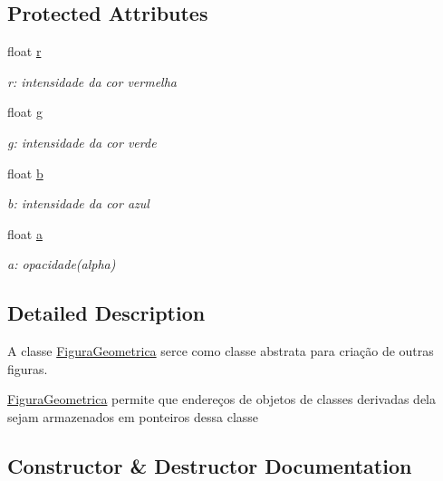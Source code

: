 \subsection*{Protected Attributes}
\begin{DoxyCompactItemize}
\item 
float \hyperlink{class_figura_geometrica_a0a4f57efb1a6c525c8aeee34c92e7eab}{r}
\begin{DoxyCompactList}\small\item\em r\+: intensidade da cor vermelha \end{DoxyCompactList}\item 
float \hyperlink{class_figura_geometrica_a51930549bcb90d016b824f10f95df355}{g}
\begin{DoxyCompactList}\small\item\em g\+: intensidade da cor verde \end{DoxyCompactList}\item 
float \hyperlink{class_figura_geometrica_a25e5d6c21410103c25ec55c0117dac0d}{b}
\begin{DoxyCompactList}\small\item\em b\+: intensidade da cor azul \end{DoxyCompactList}\item 
float \hyperlink{class_figura_geometrica_ae7c8a027fcec3c357265b90458a4d165}{a}
\begin{DoxyCompactList}\small\item\em a\+: opacidade(alpha) \end{DoxyCompactList}\end{DoxyCompactItemize}


\subsection{Detailed Description}
A classe \hyperlink{class_figura_geometrica}{Figura\+Geometrica} serce como classe abstrata para criação de outras figuras. 

\hyperlink{class_figura_geometrica}{Figura\+Geometrica} permite que endereços de objetos de classes derivadas dela sejam armazenados em ponteiros dessa classe 

\subsection{Constructor \& Destructor Documentation}
\mbox{\label{class_figura_geometrica_a81d7c7efaea511e60a15f5a363138dd9}} 
